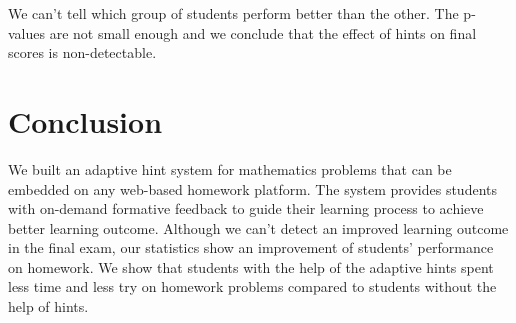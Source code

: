 \documentclass{llncs}
\begin{document}
We can't tell which group of students perform better than the other. The p-values are not small enough and we conclude that the effect of hints on final scores is non-detectable.


\section{Conclusion}
We built an adaptive hint system for mathematics problems that can be embedded on any web-based homework platform. The system provides students with on-demand formative feedback to guide their learning process to achieve better learning outcome. Although we can't detect an improved learning outcome in the final exam, our statistics show an improvement of students' performance on homework. We show that students with the help of the adaptive hints spent less time and less try on homework problems compared to students without the help of hints.

\newpage


\end{document}
